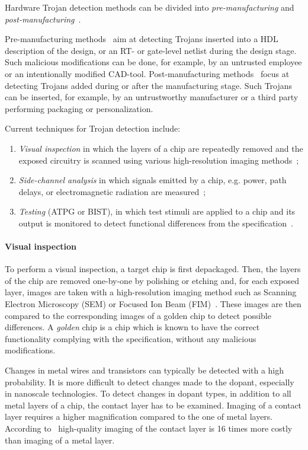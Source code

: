 \documentclass[a4paper]{llncs}
\begin{document}
Hardware Trojan detection methods can be divided into {\em pre-manufacturing} and {\em post-manufacturing}~\cite{BhH14}.

Pre-manufacturing methods~\cite{PoNNM09,Oy15,Ca15} aim at detecting Trojans inserted into a HDL description of the design, or an RT- or gate-level netlist during the design stage. Such malicious modifications can be done, for example, by an untrusted employee or an intentionally modified CAD-tool. 
Post-manufacturing methods~\cite{BeRPB13,SuSFT14} focus at detecting Trojans added during or after the manufacturing stage. Such Trojans can be inserted, for example, by an untrustworthy manufacturer or a third party performing packaging or personalization.

Current techniques for Trojan detection include:
\begin{enumerate}
\item {\em Visual inspection} in which the layers of a chip are repeatedly removed and the exposed circuitry is scanned
using various high-resolution imaging methods~\cite{Sk11,SuSFT14,Co15}; 
\item {\em Side-channel analysis} in which signals emitted by a chip, e.g. power, path delays, or electromagnetic radiation  are measured~\cite{Ji08,YiM08,RaPT10,Ngo15};
\item {\em Testing} (ATPG or BIST), in which test stimuli are applied to a chip and its output is monitored to detect functional differences from the specification~\cite{DuNS14,DupBBR15}.
\end{enumerate}

\paragraph {\bf Visual inspection}

To perform a visual inspection, a target chip is first depackaged. Then, the layers of the chip are removed one-by-one by polishing or etching and, for each exposed layer, images are taken with a high-resolution imaging method such as Scanning Electron Microscopy (SEM) or Focused Ion Beam (FIM)~\cite{Sk11}. These images are then compared to the corresponding images of a golden chip to detect possible differences. A {\em golden} chip is a chip which is known to have the correct functionality complying with the specification, without any malicious modifications. 

Changes in metal wires and transistors can typically be detected with a high probability. It is more difficult to detect changes made to the dopant, especially in nanoscale technologies. To detect changes in dopant types, in addition to all metal layers of a chip, the contact layer has to be examined. Imaging of a contact layer requires a higher magnification compared to the one of metal layers. According to~\cite{SuSFT14} high-quality imaging of the contact layer is 16 times more costly than imaging of a metal layer.
\end{document}

